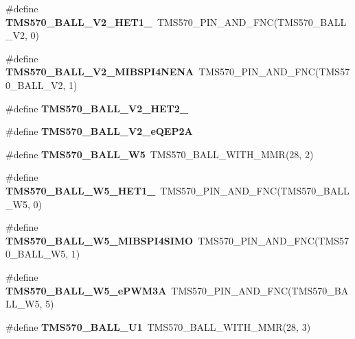 \begin{DoxyCompactItemize}
\mbox{\label{tms570lc4357-pins_8h_a146f1e98c1797e85776d43991649131a}} 
\#define {\bfseries T\+M\+S570\+\_\+\+B\+A\+L\+L\+\_\+\+V2\+\_\+\+H\+E\+T1\+\_}~T\+M\+S570\+\_\+\+P\+I\+N\+\_\+\+A\+N\+D\+\_\+\+F\+NC(T\+M\+S570\+\_\+\+B\+A\+L\+L\+\_\+\+V2, 0)
\item 
\mbox{\label{tms570lc4357-pins_8h_a5d772ea6489585d3e16e8843e0ddac2f}} 
\#define {\bfseries T\+M\+S570\+\_\+\+B\+A\+L\+L\+\_\+\+V2\+\_\+\+M\+I\+B\+S\+P\+I4\+N\+E\+NA}~T\+M\+S570\+\_\+\+P\+I\+N\+\_\+\+A\+N\+D\+\_\+\+F\+NC(T\+M\+S570\+\_\+\+B\+A\+L\+L\+\_\+\+V2, 1)
\item 
\#define {\bfseries T\+M\+S570\+\_\+\+B\+A\+L\+L\+\_\+\+V2\+\_\+\+H\+E\+T2\+\_}
\item 
\#define {\bfseries T\+M\+S570\+\_\+\+B\+A\+L\+L\+\_\+\+V2\+\_\+e\+Q\+E\+P2A}
\item 
\mbox{\label{tms570lc4357-pins_8h_aaf203ddc88659966742adc6a0f495341}} 
\#define {\bfseries T\+M\+S570\+\_\+\+B\+A\+L\+L\+\_\+\+W5}~T\+M\+S570\+\_\+\+B\+A\+L\+L\+\_\+\+W\+I\+T\+H\+\_\+\+M\+MR(28, 2)
\item 
\mbox{\label{tms570lc4357-pins_8h_a823d0aceeac4eedad2cca3524102e25b}} 
\#define {\bfseries T\+M\+S570\+\_\+\+B\+A\+L\+L\+\_\+\+W5\+\_\+\+H\+E\+T1\+\_}~T\+M\+S570\+\_\+\+P\+I\+N\+\_\+\+A\+N\+D\+\_\+\+F\+NC(T\+M\+S570\+\_\+\+B\+A\+L\+L\+\_\+\+W5, 0)
\item 
\mbox{\label{tms570lc4357-pins_8h_a95dba383231df48aeb0721b477b30807}} 
\#define {\bfseries T\+M\+S570\+\_\+\+B\+A\+L\+L\+\_\+\+W5\+\_\+\+M\+I\+B\+S\+P\+I4\+S\+I\+MO}~T\+M\+S570\+\_\+\+P\+I\+N\+\_\+\+A\+N\+D\+\_\+\+F\+NC(T\+M\+S570\+\_\+\+B\+A\+L\+L\+\_\+\+W5, 1)
\item 
\mbox{\label{tms570lc4357-pins_8h_a36f64fafd6550bd89714c98be9199755}} 
\#define {\bfseries T\+M\+S570\+\_\+\+B\+A\+L\+L\+\_\+\+W5\+\_\+e\+P\+W\+M3A}~T\+M\+S570\+\_\+\+P\+I\+N\+\_\+\+A\+N\+D\+\_\+\+F\+NC(T\+M\+S570\+\_\+\+B\+A\+L\+L\+\_\+\+W5, 5)
\item 
\mbox{\label{tms570lc4357-pins_8h_aca861b119f555423ab961b3fda2f0063}} 
\#define {\bfseries T\+M\+S570\+\_\+\+B\+A\+L\+L\+\_\+\+U1}~T\+M\+S570\+\_\+\+B\+A\+L\+L\+\_\+\+W\+I\+T\+H\+\_\+\+M\+MR(28, 3)

\end{DoxyCompactItemize}
